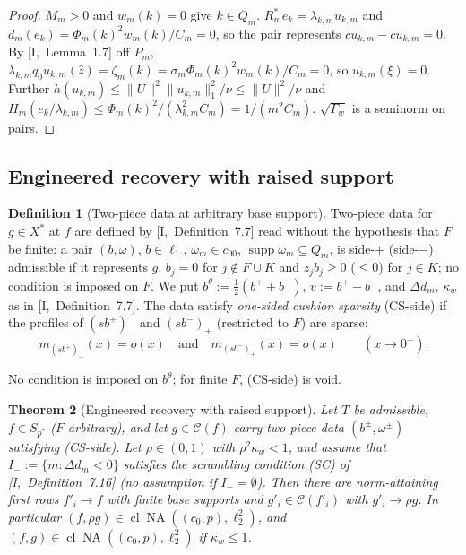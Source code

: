 \documentclass[10pt]{amsart}
\newtheorem{theorem}{Theorem}[section]
\theoremstyle{definition}
\newtheorem{definition}[theorem]{Definition}
\theoremstyle{remark}
\newcommand{\NA}{\operatorname{NA}}
\newcommand{\supp}{\operatorname{supp}}
\newcommand{\Cset}{\mathcal C}
\newcommand{\cl}{\operatorname{cl}}
\newcommand{\zh}{\hat z}
\begin{document}
\begin{proof}
$M_m>0$ and $w_m(k)=0$ give $k\in Q_m$.  $R_m^*e_k=\lambda_{k,m}u_{k,m}$ and
$d_m(e_k)=\Phi_m(k)^2w_m(k)/C_m=0$, so the pair represents $cu_{k,m}-cu_{k,m}
=0$.  By [I,~Lemma~1.7] off $P_m$, $\lambda_{k,m}q_0u_{k,m}(\zh)=\zeta_m(k)=
\sigma_m\Phi_m(k)^2w_m(k)/C_m=0$, so $u_{k,m}(\xi)=0$.  Further
$h(u_{k,m})\le\|U\|^2\|u_{k,m}\|_1^2/\nu\le\|U\|^2/\nu$ and
$H_m(e_k/\lambda_{k,m})\le\Phi_m(k)^2/(\lambda_{k,m}^2C_m)=1/(m^2C_m)$.
$\sqrt{\Gamma_w}$ is a seminorm on pairs.
\end{proof}

\subsection{Engineered recovery with raised support}\label{subsec:II-raised}

\begin{definition}[Two-piece data at arbitrary base support]
\label{def:II-twopieceinf}
Two-piece data for $g\in X^*$ at $f$ are defined by [I,~Definition~7.7]
read without the hypothesis that $F$ be finite: a pair $(b,\omega)$,
$b\in\ell_1$, $\omega_m\in c_{00}$, $\supp\omega_m\subseteq Q_m$, is
side-$+$ \textup{(}side-$-$\textup{)} admissible if it represents $g$,
$b_j=0$ for $j\notin F\cup K$ and $z_jb_j\ge0$ \textup{(}$\le0$\textup{)}
for $j\in K$; no condition is imposed on $F$.  We put $b^\theta:=
\frac12(b^++b^-)$, $v:=b^+-b^-$, and $\Delta d_m$, $\kappa_w$ as in
[I,~Definition~7.7].  The data satisfy \emph{one-sided cushion sparsity}
\textup{(CS-side)} if the profiles of $(sb^+)_-$ and $(sb^-)_+$
\textup{(}restricted to $F$\textup{)} are sparse:
\[
 m_{(sb^+)_-}(x)=o(x)\quad\text{and}\quad m_{(sb^-)_+}(x)=o(x)\qquad
 (x\to0^+).
\]
\end{definition}

No condition is imposed on $b^\theta$; for finite $F$, (CS-side) is void.

\begin{theorem}[Engineered recovery with raised support]\label{thm:II-raised}
Let $T$ be admissible, $f\in S_{p^*}$ \textup{(}$F$ arbitrary\textup{)}, and
let $g\in\Cset(f)$ carry two-piece data $(b^\pm,\omega^\pm)$ satisfying
\textup{(CS-side)}.  Let $\rho\in(0,1)$ with $\rho^2\kappa_w<1$, and assume
that $I_-:=\{m:\Delta d_m<0\}$ satisfies the scrambling condition
\textup{(SC)} of [I,~Definition~7.16] \textup{(}no assumption if
$I_-=\emptyset$\textup{)}.  Then there are norm-attaining first rows
$f'_i\to f$ with finite base supports and $g'_i\in\Cset(f'_i)$ with
$g'_i\to\rho g$.  In particular $(f,\rho g)\in\cl\NA((c_0,p),\ell_2^2)$, and
$(f,g)\in\cl\NA((c_0,p),\ell_2^2)$ if $\kappa_w\le1$.
\end{theorem}
\end{document}
